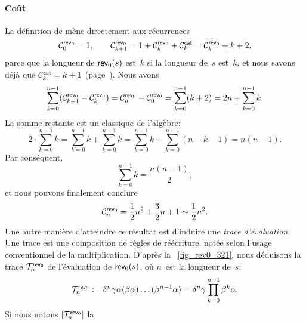 \paragraph{Coût}
\label{cost_rev0}

La définition de 
mène directement aux récurrences
\begin{equation*}
\C{\fun{rev}_0}{0} = 1,\qquad \C{\fun{rev}_0}{k+1} = 1 +
\C{\fun{rev}_0}{k} + \C{\fun{cat}}{k} = \C{\fun{rev}_0}{k} + k + 2,
\end{equation*}
parce que la longueur de \(\fun{rev}_0(s)\) est~\(k\) si la longueur
de~\(s\) est~\(k\), et nous savons déjà que \(\C{\fun{cat}}{k} = k +
1\) (page~\pageref{cost_cat}). Nous
avons
\begin{equation*}
\sum_{k=0}^{n-1}(\C{\fun{rev}_0}{k+1} - \C{\fun{rev}_0}{k}) =
\C{\fun{rev}_0}{n} - \C{\fun{rev}_0}{0} = 
\sum_{k=0}^{n-1}(k+2) = 2n + \sum_{k=0}^{n-1}{k}.
\end{equation*}
La somme restante est un classique de l'algèbre:
\begin{equation*}
2 \cdot \sum_{k=0}^{n-1}{k} = 
\sum_{k=0}^{n-1}{k} + \sum_{k=0}^{n-1}{k} = 
\sum_{k=0}^{n-1}{k} + \sum_{k=0}^{n-1}(n-k-1) = n(n-1).
\end{equation*}
Par conséquent,
\begin{equation}
\sum_{k=0}^{n-1}{k} = \frac{n(n-1)}{2},\label{eq_sum_k}
\end{equation}
et nous pouvons finalement conclure
\begin{equation*}
\C{\fun{rev}_0}{n} = \frac{1}{2}n^2 + \frac{3}{2}n + 1 \sim \frac{1}{2}n^2.
\end{equation*}
Une autre manière d'atteindre ce résultat est d'induire une
\emph{trace d'évaluation}. Une trace est une composition de
règles de réécriture, notée selon l'usage conventionnel de la
multiplication. D'après la \fig~\vref{fig_rev0_321}, nous déduisons la
trace \(\T{\fun{rev}_0}{n}\) de
l'évaluation de \(\fun{rev}_0(s)\), où
\(n\)~est la longueur de~\(s\):
\begin{equation*}
\T{\fun{rev}_0}{n} :=
\delta^n\gamma\alpha(\beta\alpha)\dots(\beta^{n-1}\alpha) =
\delta^n\gamma \prod_{k=0}^{n-1}{\beta^k\alpha}.
\end{equation*}
Si nous notons
\(\len{\T{\fun{rev}_0}{n}}\) la
